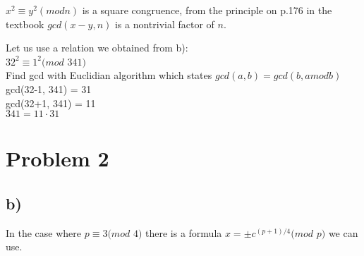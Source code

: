 \documentclass{article}
\begin{document}
$x^{2} \equiv y^{2} (mod n)$ is a square congruence, from the principle on p.176 in the textbook $gcd(x-y,n)$ is a nontrivial factor of $n$.

Let us use a relation we obtained from b):\\
$32^{2} \equiv 1^{2} (mod$ $341)$\\
Find gcd with Euclidian algorithm which states $gcd(a,b) = gcd(b, a mod b)$
gcd(32-1, 341) = 31\\
gcd(32+1, 341) = 11\\
$341 = 11 \cdotp 31$

\section*{Problem 2}

\subsection*{b)}

In the case where $p \equiv 3(mod$ $4)$ there is a formula $x = \pm c^{(p+1)/4} (mod$ $p)$ we can use.
\end{document}
